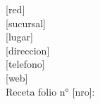 \documentclass{article}
\begin{document}
\noindent [doctor]	\hfill \phantom	\hfill [red] \\
\noindent [pos]		\hfill \phantom	\hfill [sucursal] \\
\noindent [esp]		\hfill \phantom	\hfill [lugar] \\
\noindent [rut]		\hfill \phantom	\hfill [direccion] \\
\noindent [regss]	\hfill \phantom	\hfill [telefono] \\
\noindent [regcm]	\hfill \phantom	\hfill [web] \\

\noindent Receta folio n° [nro]: \hfill \phantom \hfill \\ 
\end{document}
